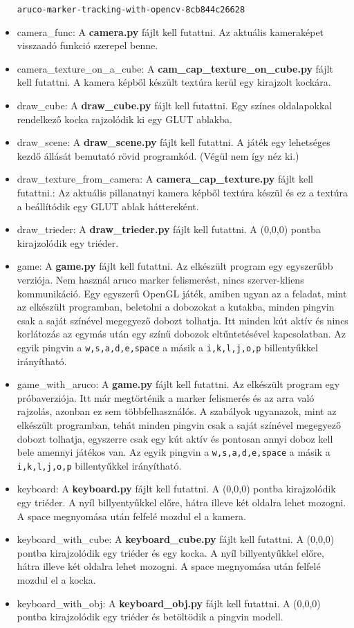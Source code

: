 \begin{itemize}
	\texttt{aruco-marker-tracking-with-opencv-8cb844c26628}
	\item camera\_func:
	A \textbf{camera.py} fájlt kell futattni.
	Az aktuális kameraképet visszaadó funkció szerepel benne. 
	\item camera\_texture\_on\_a\_cube:
	A \textbf{cam\_cap\_texture\_on\_cube.py} fájlt kell futattni.
	A kamera képből készült textúra kerül egy kirajzolt kockára.
	\item draw\_cube:
	A \textbf{draw\_cube.py} fájlt kell futattni.
	Egy színes oldalapokkal rendelkező kocka rajzolódik ki egy GLUT ablakba.
	\item draw\_scene:
	A \textbf{draw\_scene.py} fájlt kell futattni.
	A játék egy lehetséges kezdő állását bemutató rövid programkód.
	(Végül nem így néz ki.)
	\item draw\_texture\_from\_camera:
	A \textbf{camera\_cap\_texture.py} fájlt kell futattni.:
	Az aktuális pillanatnyi kamera képből textúra készül és ez a 
	textúra a beállítódik egy GLUT ablak háttereként. 
	\item draw\_trieder:
	A \textbf{draw\_trieder.py} fájlt kell futattni.
	A (0,0,0) pontba kirajzolódik egy triéder.
	\item game:
	A \textbf{game.py} fájlt kell futattni.
	Az elkészült program egy egyszerűbb verziója. Nem használ aruco marker felismerést, nincs szerver-kliens kommunikáció.
	Egy egyszerű OpenGL játék, amiben ugyan az a feladat, mint az elkészült programban, beletolni a dobozokat a kutakba, minden pingvin csak a saját színével megegyező dobozt tolhatja.
	Itt minden kút aktív és nincs korlátozás az egymás után egy színű dobozok eltűntetésével kapcsolatban.
	Az egyik pingvin a \texttt{w,s,a,d,e,space} a másik a \texttt{i,k,l,j,o,p} billentyűkkel irányítható.
	\item game\_with\_aruco:
	A \textbf{game.py} fájlt kell futattni.
	Az elkészült program egy próbaverziója. Itt már megtörténik a marker felismerés és az arra való rajzolás, azonban ez sem többfelhasználós.
	A szabályok ugyanazok, mint az elkészült programban, tehát minden pingvin csak a saját színével megegyező dobozt tolhatja, egyszerre csak egy kút aktív és
	pontosan annyi doboz kell bele amennyi játékos van.
	Az egyik pingvin a \texttt{w,s,a,d,e,space} a másik a \texttt{i,k,l,j,o,p} billentyűkkel irányítható.
	\item keyboard:
	A \textbf{keyboard.py} fájlt kell futattni.
	A (0,0,0) pontba kirajzolódik egy triéder. A nyíl billyentyűkkel előre, hátra illeve 
	két oldalra lehet mozogni.
	A space megnyomása után felfelé mozdul el a kamera.
	\item keyboard\_with\_cube:
	A \textbf{keyboard\_cube.py} fájlt kell futattni.
	A (0,0,0) pontba kirajzolódik egy triéder és egy kocka. A nyíl billyentyűkkel előre, hátra illeve két oldalra lehet mozogni.
	A space megnyomása után felfelé mozdul el a kocka.
	\item keyboard\_with\_obj:
	A \textbf{keyboard\_obj.py} fájlt kell futattni.
	A (0,0,0) pontba kirajzolódik egy triéder és betöltödik a pingvin modell.
	

\end{itemize}
